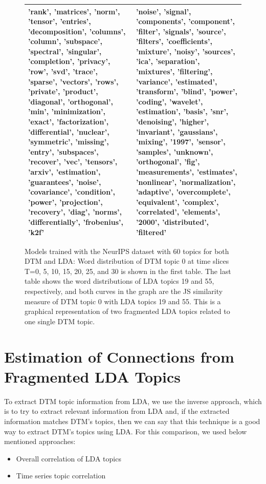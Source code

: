 \documentclass[a4paper]{report}
\begin{document}
\begin{figure}[t]
\begin{center}
\begin{tabular}{|p{7cm}|p{7cm}|}
'rank', 'matrices', 'norm', 'tensor', 'entries', 'decomposition', 'columns', 'column', 'subspace', 'spectral', 'singular', 'completion', 'privacy', 'row', 'svd', 'trace', 'sparse', 'vectors', 'rows', 'private', 'product', 'diagonal', 'orthogonal', 'min', 'minimization', 'exact', 'factorization', 'differential', 'nuclear', 'symmetric', 'missing', 'entry', 'subspaces', 'recover', 'vec', 'tensors', 'arxiv', 'estimation', 'guarantees', 'noise', 'covariance', 'condition', 'power', 'projection', 'recovery', 'diag', 'norms', 'differentially', 'frobenius', 'k2f'
&
'noise', 'signal', 'components', 'component', 'filter', 'signals', 'source', 'filters', 'coefficients', 'mixture', 'noisy', 'sources', 'ica', 'separation', 'mixtures', 'filtering', 'variance', 'estimated', 'transform', 'blind', 'power', 'coding', 'wavelet', 'estimation', 'basis', 'snr', 'denoising', 'higher', 'invariant', 'gaussians', 'mixing', '1997', 'sensor', 'samples', 'unknown', 'orthogonal', 'fig', 'measurements', 'estimates', 'nonlinear', 'normalization', 'adaptive', 'overcomplete', 'equivalent', 'complex', 'correlated', 'elements', '2000', 'distributed', 'filtered'
\\ \hline

\end{tabular}
\caption{Models trained with the NeurIPS dataset with 60 topics for both DTM and LDA: Word distribution of DTM topic 0 at time slices T=0, 5, 10, 15, 20, 25, and 30 is shown in the first table. The last table shows the word distributions of LDA topics 19 and 55, respectively, and both curves in the graph are the JS similarity measure of DTM topic 0 with LDA topics 19 and 55. This is a graphical representation of two fragmented LDA topics related to one single DTM topic.}
\label{fig:fragmentation}
\end{center}
\end{figure}

\section{Estimation of Connections from Fragmented LDA Topics}

To extract DTM topic information from LDA, we use the inverse approach, which is to try to extract relevant information from LDA and, if the extracted information matches DTM's topics, then we can say that this technique is a good way to extract DTM's topics using LDA. For this comparison, we used below mentioned approaches:

\begin{itemize}
\item Overall correlation of LDA topics
\item Time series topic correlation
\end{itemize}
\end{document}
